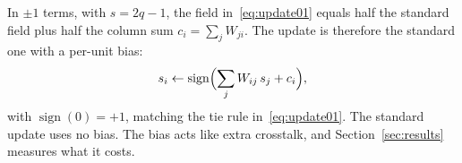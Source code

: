In $\pm 1$ terms, with $s = 2q - 1$, the field in~\eqref{eq:update01} equals half the standard field plus half the column sum $c_i = \sum_j W_{ji}$. The update is therefore the standard one with a per-unit bias:
\begin{equation}
s_i \leftarrow \operatorname{sign}\Bigl(\sum_j W_{ij}\, s_j + c_i\Bigr), \label{eq:bias}
\end{equation}
with $\operatorname{sign}(0) = +1$, matching the tie rule in~\eqref{eq:update01}. The standard update uses no bias. The bias acts like extra crosstalk, and Section~\ref{sec:results} measures what it costs.
